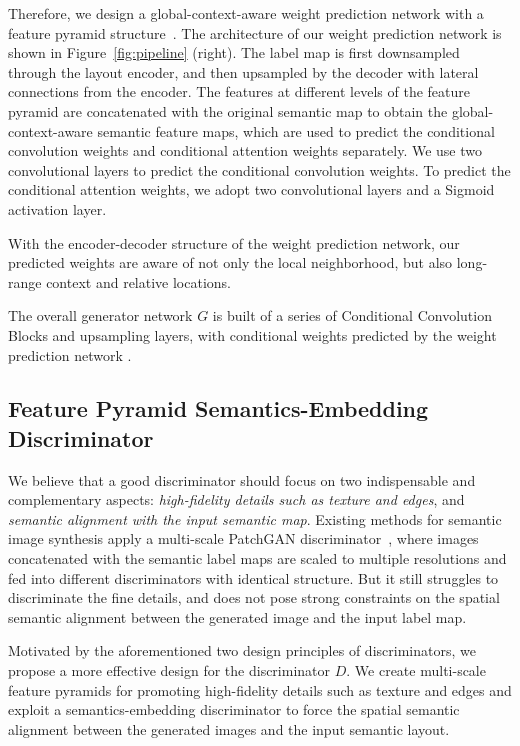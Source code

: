 \documentclass{article}
\begin{document}
Therefore, we design a global-context-aware weight prediction network with a feature pyramid structure~\cite{lin2017feature}.
The architecture of our weight prediction network is shown in Figure~\ref{fig:pipeline} (right).
The label map is first downsampled through the layout encoder, and then upsampled by the decoder with lateral connections from the encoder.
The features at different levels of the feature pyramid are concatenated with the original semantic map to obtain the global-context-aware semantic feature maps, which are used to predict the conditional convolution weights and conditional attention weights separately.
We use two convolutional layers to predict the conditional convolution weights.
To predict the conditional attention weights, we adopt two convolutional layers and a Sigmoid activation layer.


With the encoder-decoder structure of the weight prediction network, our predicted weights are aware of not only the local neighborhood, but also long-range context and relative locations.


The overall generator network $G$ is built of a series of Conditional Convolution Blocks and upsampling layers, with conditional weights predicted by the weight prediction network .
\subsection{Feature Pyramid Semantics-Embedding Discriminator}

We believe that a good discriminator should focus on two indispensable and complementary aspects: \textit{high-fidelity details such as texture and edges}, and \textit{semantic alignment with the input semantic map}.
Existing methods for semantic image synthesis apply a multi-scale PatchGAN discriminator~\cite{wang2018high,park2019semantic}, where images concatenated with the semantic label maps are scaled to multiple resolutions and fed into different discriminators with identical structure.
But it still struggles to discriminate the fine details, and does not pose strong constraints on the spatial semantic alignment between the generated image and the input label map.








Motivated by the aforementioned two design principles of discriminators, we propose a more effective design for the discriminator $D$.
We create multi-scale feature pyramids for promoting high-fidelity details such as texture and edges and exploit a semantics-embedding discriminator to force the spatial semantic alignment between the generated images and the input semantic layout.
\end{document}
